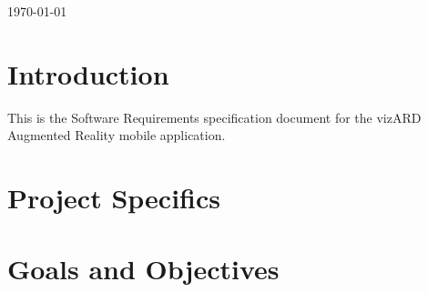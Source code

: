 \documentclass[a4paper,12pt]{article}
\begin{document}
\begin{titlepage}

{\large \today}\\[3cm] %

 

\vfill %

\end{titlepage}

\newpage


\tableofcontents

\newpage

\section{Introduction}

This is the Software Requirements specification document for the vizARD Augmented Reality mobile application.

\newpage
\section{Project Specifics} %

\newpage
\section{Goals and Objectives} %
\end{document}
